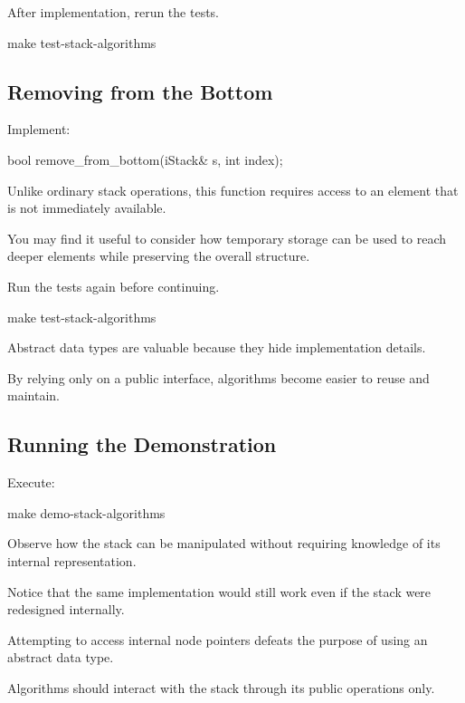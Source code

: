 \documentclass{csc2059practical}
\begin{document}
After implementation, rerun the tests.

\begin{terminal}
make test-stack-algorithms
\end{terminal}

\subsection*{Removing from the Bottom}

Implement:

\begin{cppcode}
bool remove_from_bottom(iStack& s,
                        int index);
\end{cppcode}

Unlike ordinary stack operations, this function requires access to an
element that is not immediately available.

You may find it useful to consider how temporary storage can be used
to reach deeper elements while preserving the overall structure.

Run the tests again before continuing.

\begin{terminal}
make test-stack-algorithms
\end{terminal}

\begin{tipbox}

Abstract data types are valuable because they hide implementation
details.

By relying only on a public interface, algorithms become easier to
reuse and maintain.

\end{tipbox}

\subsection*{Running the Demonstration}

Execute:

\begin{terminal}
make demo-stack-algorithms
\end{terminal}

Observe how the stack can be manipulated without requiring knowledge
of its internal representation.

Notice that the same implementation would still work even if the stack
were redesigned internally.

\begin{commonerror}

Attempting to access internal node pointers defeats the purpose of
using an abstract data type.

Algorithms should interact with the stack through its public
operations only.

\end{commonerror}
\end{document}
